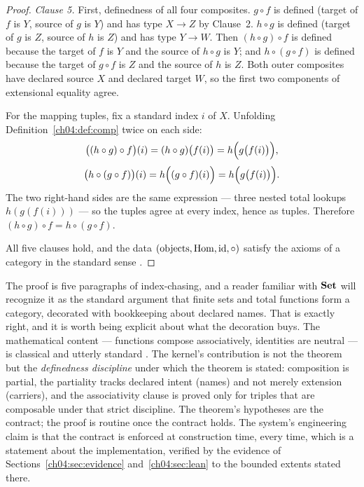 \begin{proof}
\emph{Clause 5.} First, definedness of all four composites. $g \circ f$ is
defined (target of $f$ is $Y$, source of $g$ is $Y$) and has type $X \to Z$
by Clause~2. $h \circ g$ is defined (target of $g$ is $Z$, source of $h$ is
$Z$) and has type $Y \to W$. Then $(h \circ g) \circ f$ is defined because
the target of $f$ is $Y$ and the source of $h \circ g$ is $Y$; and
$h \circ (g \circ f)$ is defined because the target of $g \circ f$ is $Z$
and the source of $h$ is $Z$. Both outer composites have declared source $X$
and declared target $W$, so the first two components of extensional
equality agree.

For the mapping tuples, fix a standard index $i$ of $X$. Unfolding
Definition~\ref{ch04:def:comp} twice on each side:
\[
  \bigl((h \circ g) \circ f\bigr)(i)
  = (h \circ g)\bigl(f(i)\bigr)
  = h\Bigl(g\bigl(f(i)\bigr)\Bigr),
\]
\[
  \bigl(h \circ (g \circ f)\bigr)(i)
  = h\Bigl((g \circ f)(i)\Bigr)
  = h\Bigl(g\bigl(f(i)\bigr)\Bigr).
\]
The two right-hand sides are the same expression --- three nested total
lookups $h(g(f(i)))$ --- so the tuples agree at every index, hence as
tuples. Therefore $(h \circ g) \circ f = h \circ (g \circ f)$.

All five clauses hold, and the data $(\text{objects}, \mathrm{Hom}, \mathrm{id}, \circ)$
satisfy the axioms of a category in the standard sense
\cite{maclanecwm}.
\end{proof}

\begin{remark}
\label{ch04:rem:short}
The proof is five paragraphs of index-chasing, and a reader familiar with
$\mathbf{Set}$ will recognize it as the standard argument that finite sets and total
functions form a category, decorated with bookkeeping about declared names.
That is exactly right, and it is worth being explicit about what the
decoration buys. The mathematical content --- functions compose
associatively, identities are neutral --- is classical and utterly standard
\cite{maclanecwm}. The kernel's contribution is not the theorem but the
\emph{definedness discipline} under which the theorem is stated: composition
is partial, the partiality tracks declared intent (names) and not merely
extension (carriers), and the associativity clause is proved only for
triples that are composable under that strict discipline. The theorem's
hypotheses are the contract; the proof is routine once the contract holds.
The system's engineering claim is that the contract is enforced at
construction time, every time, which is a statement about the
implementation, verified by the evidence of
Sections~\ref{ch04:sec:evidence} and~\ref{ch04:sec:lean} to the bounded
extents stated there.
\end{remark}

